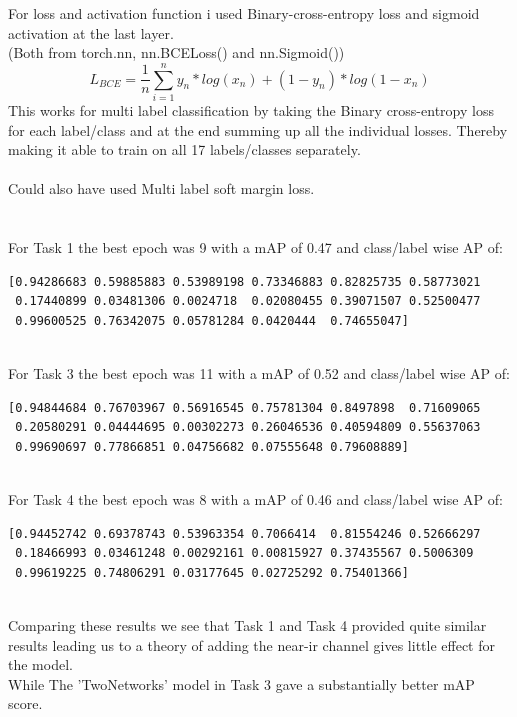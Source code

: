 \documentclass[12pt, letterpaper, twoside]{article}
\begin{document}
For loss and activation function i used Binary-cross-entropy loss and sigmoid activation at the last layer.\\
(Both from torch.nn, nn.BCELoss() and nn.Sigmoid())\\
$$
L_{BCE} = \frac{1}{n} \sum_{i=1}^n y_n * log(x_n) + (1 - y_n) * log(1 - x_n)
$$
This works for multi label classification by taking the Binary cross-entropy loss for each label/class and at the end summing up all the individual losses. Thereby making it able to train on all 17 labels/classes separately.\\
\ \\
Could also have used Multi label soft margin loss.\\
\ \\
\ \\
For Task 1 the best epoch was 9 with a mAP of 0.47 and class/label wise AP of:\\
\begin{verbatim}
[0.94286683 0.59885883 0.53989198 0.73346883 0.82825735 0.58773021
 0.17440899 0.03481306 0.0024718  0.02080455 0.39071507 0.52500477
 0.99600525 0.76342075 0.05781284 0.0420444  0.74655047]
\end{verbatim}
\ \\
For Task 3 the best epoch was 11 with a mAP of 0.52 and class/label wise AP of:\\
\begin{verbatim}
[0.94844684 0.76703967 0.56916545 0.75781304 0.8497898  0.71609065
 0.20580291 0.04444695 0.00302273 0.26046536 0.40594809 0.55637063
 0.99690697 0.77866851 0.04756682 0.07555648 0.79608889]
\end{verbatim}
\ \\
For Task 4 the best epoch was 8 with a mAP of 0.46 and class/label wise AP of:\\
\begin{verbatim}
[0.94452742 0.69378743 0.53963354 0.7066414  0.81554246 0.52666297
 0.18466993 0.03461248 0.00292161 0.00815927 0.37435567 0.5006309
 0.99619225 0.74806291 0.03177645 0.02725292 0.75401366]
\end{verbatim}
\ \\
Comparing these results we see that Task 1 and Task 4 provided quite similar results leading us to a theory of adding the near-ir channel gives little effect for the model.\\
While The 'TwoNetworks' model in Task 3 gave a substantially better mAP score.\\
\ \\
\end{document}
